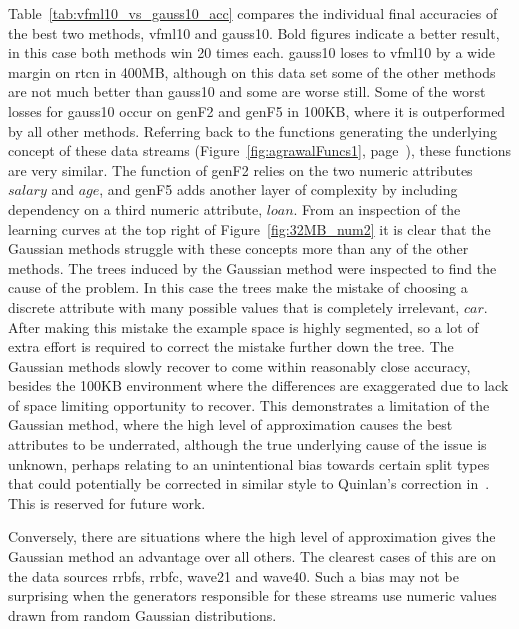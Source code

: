 Table~\ref{tab:vfml10_vs_gauss10_acc} compares the individual final accuracies of the best two methods, {\sc vfml10} and {\sc gauss10}. Bold figures indicate a better result, in this case both methods win 20 times each.
{\sc gauss10} loses to {\sc vfml10} by a wide margin on {\sc rtcn} in 400MB, although on this data set some of the other methods are not much better than {\sc gauss10} and some are worse still.
Some of the worst losses for {\sc gauss10} occur on {\sc genF2} and {\sc genF5} in 100KB, where it is outperformed by all other methods. Referring back to the functions generating the underlying concept of these data streams (Figure~\ref{fig:agrawalFuncs1}, page~\pageref{fig:agrawalFuncs1}), these functions are very similar. The function of {\sc genF2} relies on the two numeric attributes $salary$ and $age$, and {\sc genF5} adds another layer of complexity by including dependency on a third numeric attribute, $loan$. From an inspection of the learning curves at the top right of Figure~\ref{fig:32MB_num2} it is clear that the Gaussian methods struggle with these concepts more than any of the other methods.
The trees induced by the Gaussian method were inspected to find the cause of the problem. In this case the trees make the mistake of choosing a discrete attribute with many possible values that is completely irrelevant, $car$. After making this mistake the example space is highly segmented, so a lot of extra effort is required to correct the mistake further down the tree. The Gaussian methods slowly recover to come within reasonably close accuracy, besides the 100KB environment where the differences are exaggerated due to lack of space limiting opportunity to recover. This demonstrates a limitation of the Gaussian method, where the high level of approximation causes the best attributes to be underrated, although the true underlying cause of the issue is unknown, perhaps relating to an unintentional bias towards certain split types that could potentially be corrected in similar style to Quinlan's correction in~\cite{c4.5rel8}. This is reserved for future work.

Conversely, there are situations where the high level of approximation gives the Gaussian method an advantage over all others. The clearest cases of this are on the data sources {\sc rrbfs}, {\sc rrbfc}, {\sc wave21} and {\sc wave40}.
Such a bias may not be surprising when the generators responsible for these streams use numeric values drawn from random Gaussian distributions.

